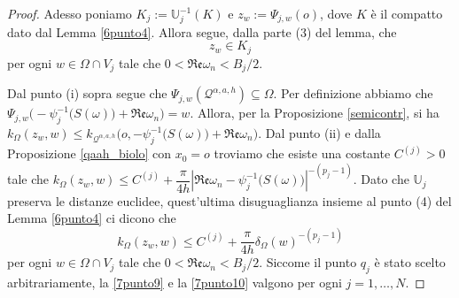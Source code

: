 \begin{proof}
    Adesso poniamo $K_j:=\mathbb{U}_j^{-1}(K)$ e $z_w:=\Psi_{j,w}(o)$, dove $K$ è il compatto dato dal Lemma \ref{6punto4}. Allora segue, dalla parte (3) del lemma, che
    \begin{equation}\label{7punto9}
        z_w\in K_j
    \end{equation}
    per ogni $w\in\Omega\cap V_j$ tale che $0<\mathfrak{Re}\omega_n<B_j/2$.

    Dal punto (i) sopra segue che $\Psi_{j,w}(\mathcal{Q}^{\alpha,a,h})\subseteq\Omega$. Per definizione abbiamo che $\Psi_{j,w}\Big(-\psi_j^{-1}\big(S(\omega)\big)+\mathfrak{Re}\omega_n\Big)=w$. Allora, per la Proposizione \ref{semicontr}, si ha $k_\Omega(z_w,w)\le k_{\mathcal{Q}^{\alpha,a,h}}\Big(o,-\psi_j^{-1}\big(S(\omega)\big)+\mathfrak{Re}\omega_n\Big)$. Dal punto (ii) e dalla Proposizione \ref{qaah_biolo} con $x_0=o$ troviamo che esiste una costante $C^{(j)}>0$ tale che $k_\Omega(z_w,w)\le C^{(j)}+\dfrac{\pi}{4h}\left|\mathfrak{Re}\omega_n-\psi_j^{-1}\big(S(\omega)\big)\right|^{-(p_j-1)}$. Dato che $\mathbb{U}_j$ preserva le distanze euclidee, quest'ultima disuguaglianza insieme al punto (4) del Lemma \ref{6punto4} ci dicono che
    \begin{equation}\label{7punto10}
        k_\Omega(z_w,w) \le C^{(j)}+\frac{\pi}{4h}\delta_\Omega(w)^{-(p_j-1)}
    \end{equation}
    per ogni $w\in\Omega\cap V_j$ tale che $0<\mathfrak{Re}\omega_n<B_j/2$. Siccome il punto $q_j$ è stato scelto arbitrariamente, la \eqref{7punto9} e la \eqref{7punto10} valgono per ogni $j=1,\dots,N$.


\end{proof}
